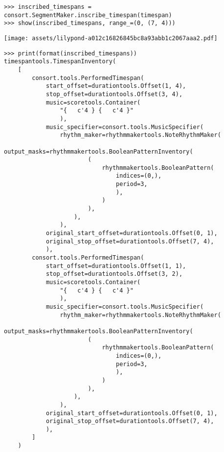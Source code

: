 \begin{abjadbookoutput}
\begin{singlespacing}
\vspace{-0.5\baselineskip}
\begin{verbatim}
>>> inscribed_timespans = consort.SegmentMaker.inscribe_timespan(timespan)
>>> show(inscribed_timespans, range_=(0, (7, 4)))
\end{verbatim}
\noindent\texttt{[image: assets/lilypond-a012c16826845bc8a93abb1c2067aaa2.pdf]}
\begin{verbatim}
>>> print(format(inscribed_timespans))
timespantools.TimespanInventory(
    [
        consort.tools.PerformedTimespan(
            start_offset=durationtools.Offset(1, 4),
            stop_offset=durationtools.Offset(3, 4),
            music=scoretools.Container(
                "{   c'4 } {   c'4 }"
                ),
            music_specifier=consort.tools.MusicSpecifier(
                rhythm_maker=rhythmmakertools.NoteRhythmMaker(
                    output_masks=rhythmmakertools.BooleanPatternInventory(
                        (
                            rhythmmakertools.BooleanPattern(
                                indices=(0,),
                                period=3,
                                ),
                            )
                        ),
                    ),
                ),
            original_start_offset=durationtools.Offset(0, 1),
            original_stop_offset=durationtools.Offset(7, 4),
            ),
        consort.tools.PerformedTimespan(
            start_offset=durationtools.Offset(1, 1),
            stop_offset=durationtools.Offset(3, 2),
            music=scoretools.Container(
                "{   c'4 } {   c'4 }"
                ),
            music_specifier=consort.tools.MusicSpecifier(
                rhythm_maker=rhythmmakertools.NoteRhythmMaker(
                    output_masks=rhythmmakertools.BooleanPatternInventory(
                        (
                            rhythmmakertools.BooleanPattern(
                                indices=(0,),
                                period=3,
                                ),
                            )
                        ),
                    ),
                ),
            original_start_offset=durationtools.Offset(0, 1),
            original_stop_offset=durationtools.Offset(7, 4),
            ),
        ]
    )
\end{verbatim}
\end{singlespacing}
\end{abjadbookoutput}

